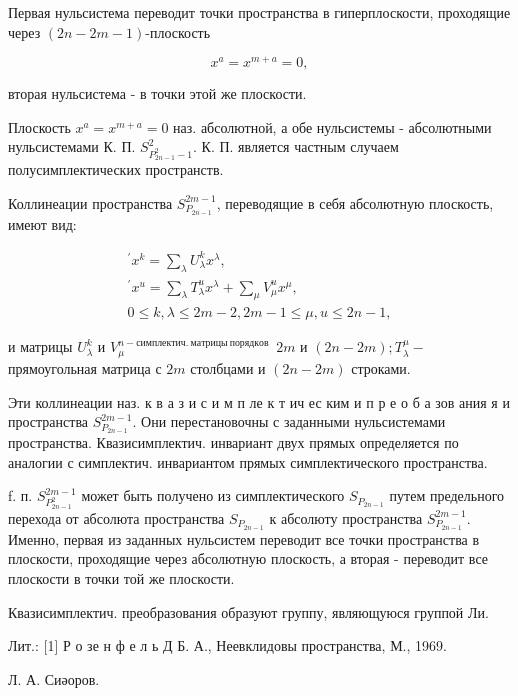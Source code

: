 \documentclass[10pt]{article}
\begin{document}
Первая нульсистема переводит точки пространства в гиперплоскости, проходящие через $(2 n-2 m-1)$-плоскость



\[

x^{a}=x^{m+a}=0,

\]



вторая нульсистема - в точки этой же плоскости.



Плоскость $x^{a}=x^{m+a}=0$ наз. абсолютной, а обе нульсистемы - абсолютными нульсистемами К. П. $S_{P_{2 n-1}^{2}-1}^{2}$. К. П. является частным случаем полусимплектических пространств.



Коллинеации пространства $S_{P_{2 n-1}}^{2 m-1}$, переводящие в себя абсолютную плоскость, имеют вид:



\[

\begin{gathered}

{ }^{\prime} x^{k}=\sum_{\lambda} U_{\lambda}^{k} x^{\lambda}, \\

{ }^{\prime} x^{u}=\sum_{\lambda} T_{\lambda}^{u} x^{\lambda}+\sum_{\mu} V_{\mu}^{u} x^{\mu}, \\

0 \leqslant k, \lambda \leqslant 2 m-2,2 m-1 \leqslant \mu, u \leqslant 2 n-1,

\end{gathered}

\]



и матрицы $U_{\lambda}^{k}$ и $V_{\mu}^{n-с и м п л е к т и ч . ~ м а т р и ц ы ~ п о р я д к о в ~}$ $2 m$ и $(2 n-2 m) ; T_{\lambda}^{\mu}-$ прямоугольная матрица с $2 m$ столбцами и $(2 n-2 m)$ строками.



Эти коллинеации наз. к в а з и с и м п ле к т ич ес ким и п р е о б а зов ания я и пространства $S_{P_{2 n-1}}^{2 m-1}$. Они перестановочны с заданными нульсистемами пространства. Квазисимплектич. инвариант двух прямых определяется по аналогии с симплектич. инвариантом прямых симплектического пространства.



f. п. $S_{P_{2 n-1}^{2}}^{2 m-1}$ может быть получено из симплектического $S_{P_{2 n-1}}$ путем предельного перехода от абсолюта пространства $S_{P_{2 n-1}}$ к абсолюту пространства $S_{P_{2 n-1}}^{2 m-1}$. Именно, первая из заданных нульсистем переводит все точки пространства в плоскости, проходящие через абсолютную плоскость, а вторая - переводит все плоскости в точки той же плоскости.



Квазисимплектич. преобразования образуют группу, являющуюся группой Ли.



Лит.: [1] Р о зе н ф е л ь Д Б. А., Неевклидовы пространства, М., 1969.



Л. А. Сиәоров.
\end{document}
